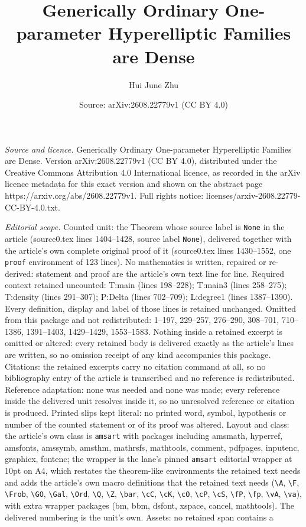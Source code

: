 \documentclass[10pt,a4paper]{amsart}
\title[Generically Ordinary One-parameter Hyperelliptic Families ar]{Generically Ordinary One-parameter Hyperelliptic Families are Dense}
\author{Hui June Zhu}
\date{Source: arXiv:2608.22779v1 (CC BY 4.0)}
\begin{document}
\maketitle

\noindent\emph{Source and licence.} Generically Ordinary One-parameter Hyperelliptic Families are Dense. Version arXiv:2608.22779v1 (CC BY 4.0), distributed under the Creative Commons Attribution 4.0 International licence, as recorded in the arXiv licence metadata for this exact version and shown on the abstract page https://arxiv.org/abs/2608.22779v1. Full rights notice: licenses/arxiv-2608.22779-CC-BY-4.0.txt.\par\smallskip

\noindent\textit{Editorial scope.} Counted unit: the Theorem whose source label is \texttt{None} in the article (source0.tex lines 1404--1428, source label \texttt{None}), delivered together with the article's own complete original proof of it (source0.tex lines 1430--1552, one \texttt{proof} environment of 123 lines). No mathematics is written, repaired or re-derived: statement and proof are the article's own text line for line. Required context retained uncounted: T:main (lines 198--228); T:main3 (lines 258--275); T:density (lines 291--307); P:Delta (lines 702--709); L:degree1 (lines 1387--1390). Every definition, display and label of those lines is retained unchanged. Omitted from this package and not redistributed: 1--197, 229--257, 276--290, 308--701, 710--1386, 1391--1403, 1429--1429, 1553--1583. Nothing inside a retained excerpt is omitted or altered: every retained body is delivered exactly as the article's lines are written, so no omission receipt of any kind accompanies this package. Citations: the retained excerpts carry no citation command at all, so no bibliography entry of the article is transcribed and no reference is redistributed. Reference adaptation: none was needed and none was made; every reference inside the delivered unit resolves inside it, so no unresolved reference or citation is produced. Printed slips kept literal: no printed word, symbol, hypothesis or number of the counted statement or of its proof was altered. Layout and class: the article's own class is \texttt{amsart} with packages including amsmath, hyperref, amsfonts, amssymb, amsthm, mathrsfs, mathtools, comment, pdfpages, inputenc, graphicx, fontenc; the wrapper is the lane's pinned \texttt{amsart} editorial wrapper at 10pt on A4, which restates the theorem-like environments the retained text needs and adds the article's own macro definitions that the retained text needs (\texttt{\textbackslash A}, \texttt{\textbackslash F}, \texttt{\textbackslash Frob}, \texttt{\textbackslash GO}, \texttt{\textbackslash Gal}, \texttt{\textbackslash Ord}, \texttt{\textbackslash Q}, \texttt{\textbackslash Z}, \texttt{\textbackslash bar}, \texttt{\textbackslash cC}, \texttt{\textbackslash cK}, \texttt{\textbackslash cO}, \texttt{\textbackslash cP}, \texttt{\textbackslash cS}, \texttt{\textbackslash fP}, \texttt{\textbackslash fp}, \texttt{\textbackslash vA}, \texttt{\textbackslash va}), with extra wrapper packages (bm, bbm, dsfont, xspace, cancel, mathtools). The delivered numbering is the unit's own. Assets: no retained span contains a 
\end{document}
